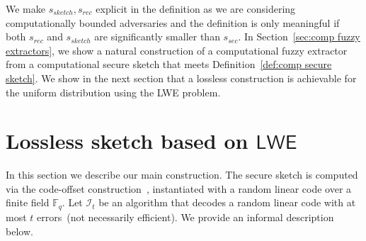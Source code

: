 \documentclass[11pt]{article}
\newcommand{\secref}[1]{\mbox{Section~\ref{#1}}}
\newcommand{\defref}[1]{\mbox{Definition~\ref{#1}}}
\newcommand{\consref}[1]{\mbox{Construction~\ref{#1}}}
\newcommand{\class}[1]{{\ensuremath{\mathsf{#1}}}}
\newcommand{\Fq}{\ensuremath{\mathbb{F}_q}}
\begin{document}
We make $s_{sketch}, s_{rec}$ explicit in the definition as we are considering computationally bounded adversaries and the definition is only meaningful if both $s_{rec}$ and $s_{sketch}$ are significantly smaller than $s_{sec}$.  In \secref{sec:comp fuzzy extractors}, we show a natural construction of a computational fuzzy extractor from a computational secure sketch that meets \defref{def:comp secure sketch}.  We show in the next section that a lossless construction is achievable for the uniform distribution using the LWE problem.

\section{Lossless sketch based on \class{LWE}}
\label{sec:fuzzyCompExt}

In this section we describe our main construction.  The secure sketch is computed via the code-offset construction~\cite{JW99},\cite[Section 5]{DBLP:journals/siamcomp/DodisORS08} instantiated with a random linear code over a finite field $\Fq$.   Let $\mathcal{I}_t$ be an algorithm that decodes a random linear code with at most $t$ errors~(not necessarily efficient).  We provide an informal description below.
\end{document}

